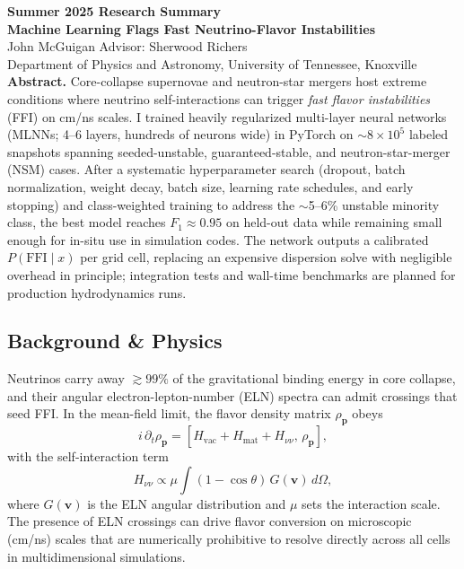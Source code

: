 \documentclass[10pt]{article}
\begin{document}
\begin{center}
{\Large \textbf{Summer 2025 Research Summary}}\\[2pt]
{\large \textbf{Machine Learning Flags Fast Neutrino-Flavor Instabilities}}\\[4pt]
John McGuigan \quad Advisor: Sherwood Richers\\
Department of Physics and Astronomy, University of Tennessee, Knoxville\\

\textbf{Abstract.}
Core-collapse supernovae and neutron-star mergers host extreme conditions where neutrino self-interactions can trigger \emph{fast flavor instabilities} (FFI) on cm/ns scales.
I trained heavily regularized multi-layer neural networks (MLNNs; 4--6 layers, hundreds of neurons wide) in PyTorch on $\sim 8\times 10^5$ labeled snapshots spanning seeded-unstable, guaranteed-stable, and neutron-star-merger (NSM) cases.
After a systematic hyperparameter search (dropout, batch normalization, weight decay, batch size, learning rate schedules, and early stopping) and class-weighted training to address the $\sim$5--6\% unstable minority class, the best model reaches $F_1 \approx 0.95$ on held-out data while remaining small enough for in-situ use in simulation codes.
The network outputs a calibrated $P(\mathrm{FFI}\mid x)$ per grid cell, replacing an expensive dispersion solve with negligible overhead in principle; integration tests and wall-time benchmarks are planned for production hydrodynamics runs.

\subsection*{Background \& Physics}
Neutrinos carry away $\gtrsim 99\%$ of the gravitational binding energy in core collapse, and their angular electron-lepton-number (ELN) spectra can admit crossings that seed FFI.
In the mean-field limit, the flavor density matrix $\rho_{\mathbf{p}}$ obeys
\begin{equation*}
i\,\partial_t \rho_{\mathbf{p}} = \left[ H_{\mathrm{vac}} + H_{\mathrm{mat}} + H_{\nu\nu}, \, \rho_{\mathbf{p}} \right],
\end{equation*}
with the self-interaction term
\begin{equation*}
H_{\nu\nu} \propto \mu \!\int (1-\cos\theta)\, G(\mathbf{v})\, d\Omega,
\end{equation*}
where $G(\mathbf{v})$ is the ELN angular distribution and $\mu$ sets the interaction scale. The presence of ELN crossings can drive flavor conversion on microscopic (cm/ns) scales that are numerically prohibitive to resolve directly across all cells in multidimensional simulations.


\end{center}
\end{document}
